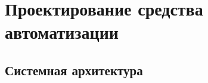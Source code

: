 \section{\large{Проектирование средства автоматизации}}



\subsection{\Large{Системная архитектура}}







%
%
%
%
%